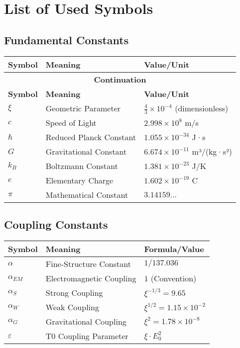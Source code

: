 \documentclass[12pt,a4paper]{article}
\begin{document}
	\appendix
	
	\section{List of Used Symbols}
	
	\subsection{Fundamental Constants}
	
	\begin{longtable}{lll}
		\toprule
		\textbf{Symbol} & \textbf{Meaning} & \textbf{Value/Unit} \\
		\midrule
		\endfirsthead
		\multicolumn{3}{c}{{\bfseries Continuation}} \\
		\toprule
		\textbf{Symbol} & \textbf{Meaning} & \textbf{Value/Unit} \\
		\midrule
		\endhead
		\bottomrule
		\endfoot
		\bottomrule
		\endlastfoot
		
		$\xi$ & Geometric Parameter & $\frac{4}{3} \times 10^{-4}$ (dimensionless) \\
		$c$ & Speed of Light & $2.998 \times 10^8$ m/s \\
		$\hbar$ & Reduced Planck Constant & $1.055 \times 10^{-34}$ J·s \\
		$G$ & Gravitational Constant & $6.674 \times 10^{-11}$ m³/(kg·s²) \\
		$k_B$ & Boltzmann Constant & $1.381 \times 10^{-23}$ J/K \\
		$e$ & Elementary Charge & $1.602 \times 10^{-19}$ C \\
		$\pi$ & Mathematical Constant & $3.14159...$ \\
	\end{longtable}
	
	\subsection{Coupling Constants}
	
	\begin{longtable}{lll}
		\toprule
		\textbf{Symbol} & \textbf{Meaning} & \textbf{Formula/Value} \\
		\midrule
		$\alpha$ & Fine-Structure Constant & $1/137.036$ \\
		$\alpha_{EM}$ & Electromagnetic Coupling & $1$ (Convention) \\
		$\alpha_S$ & Strong Coupling & $\xi^{-1/3} = 9.65$ \\
		$\alpha_W$ & Weak Coupling & $\xi^{1/2} = 1.15 \times 10^{-2}$ \\
		$\alpha_G$ & Gravitational Coupling & $\xi^{2} = 1.78 \times 10^{-8}$ \\
		$\varepsilon$ & T0 Coupling Parameter & $\xi \cdot E_0^2$ \\
		\bottomrule
	\end{longtable}
	
\end{document}
